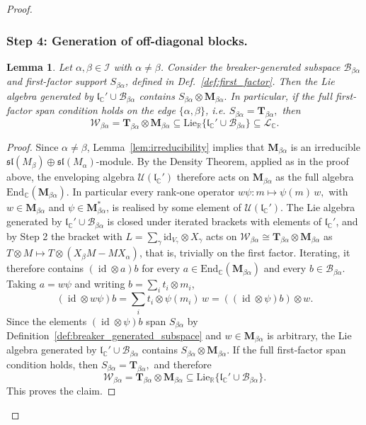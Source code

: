 \documentclass[11pt,letterpaper]{article}
\newcounter{alg}
\theoremstyle{plain}
\theoremstyle{plain}
\theoremstyle{plain}
\theoremstyle{plain}
\theoremstyle{plain}
\theoremstyle{plain}
\newcommand{\C}{\mathbb{C}}
\newcommand{\R}{\mathbb{R}}
\newcommand{\End}{\mathrm{End}}
\newcommand{\Lie}{\mathrm{Lie}}
\newcommand{\id}{\mathrm{id}}
\theoremstyle{plain}
\newtheorem{smlemma}[smtheorem]{Lemma}
\theoremstyle{definition}
\theoremstyle{plain}
\begin{document}
\begin{proof}
\subsubsection*{Step 4: Generation of off-diagonal blocks.}

\begin{smlemma}\label{prop:block_generation}
Let $\alpha,\beta\in\mathcal I$ with $\alpha\neq\beta$. Consider the
breaker-generated subspace $\mathcal B_{\beta\alpha}$ and first-factor support $S_{\beta\alpha}$, defined in Def.~\ref{def:first_factor}. Then the Lie algebra generated by
$
\mathfrak l_\C' \cup \mathcal B_{\beta\alpha}
$
contains
$
S_{\beta\alpha}\otimes \mathbf M_{\beta\alpha}.
$
In particular, if the full first-factor span condition holds on the edge $\{\alpha,\beta\}$, i.e.
$
S_{\beta\alpha}=\mathbf T_{\beta\alpha},
$
then
\[
\mathcal W_{\beta\alpha}
=
\mathbf T_{\beta\alpha}\otimes \mathbf M_{\beta\alpha}
\subseteq
\Lie_{\R}\{\mathfrak l_\C' \cup \mathcal B_{\beta\alpha}\}
\subseteq \mathcal L_\C.
\]
\end{smlemma}

\begin{proof}
Since $\alpha\neq\beta$, Lemma~\ref{lem:irreducibility} implies that $\mathbf M_{\beta\alpha}$ is an irreducible
$\mathfrak{sl}(M_\beta)\oplus \mathfrak{sl}(M_\alpha)$-module.
By the Density Theorem, applied as in the proof above, the enveloping algebra $\mathcal U(\mathfrak l_\C')$ therefore acts on $\mathbf M_{\beta\alpha}$ 
as the full algebra $\End_\C(\mathbf M_{\beta\alpha})$. In particular every rank-one operator
$
w\psi:m\mapsto\psi(m)\,w,
$
with $w\in\mathbf M_{\beta\alpha}$ and $\psi\in\mathbf M_{\beta\alpha}^*$, is realised by some element of $\mathcal U(\mathfrak l_\C')$.
The Lie algebra generated by $\mathfrak l_\C'\cup\mathcal B_{\beta\alpha}$ is closed under iterated brackets with elements of $\mathfrak l_\C'$, 
and by Step 2 the bracket with $L=\sum_\gamma\id_{V_\gamma}\otimes X_\gamma$ acts on $\mathcal W_{\beta\alpha}\cong\mathbf T_{\beta\alpha}\otimes\mathbf M_{\beta\alpha}$ as $T\otimes M\mapsto T\otimes(X_\beta M-MX_\alpha)$, 
that is, trivially on the first factor. Iterating, it therefore contains $(\operatorname{id}\otimes a)b$ for every $a\in\End_\C(\mathbf M_{\beta\alpha})$ 
and every $b\in\mathcal B_{\beta\alpha}$. Taking $a=w\psi$ and writing $b=\sum_i t_i\otimes m_i$,
\[
\left(\operatorname{id}\otimes w\psi\right)b
=\sum_i t_i\otimes\psi(m_i)\,w
=\left(\left(\operatorname{id}\otimes\psi\right)b\right)\otimes w .
\]
Since the elements $(\operatorname{id}\otimes\psi)b$ span $S_{\beta\alpha}$ by Definition~\ref{def:breaker_generated_subspace} and $w\in\mathbf M_{\beta\alpha}$ is arbitrary, the Lie algebra generated by
$
\mathfrak l_\C' \cup \mathcal B_{\beta\alpha}
$
contains
$
S_{\beta\alpha}\otimes \mathbf M_{\beta\alpha}.
$
If the full first-factor span condition holds, then
$
S_{\beta\alpha}=\mathbf T_{\beta\alpha},
$
and therefore
\[
\mathcal W_{\beta\alpha}
=
\mathbf T_{\beta\alpha}\otimes \mathbf M_{\beta\alpha}
\subseteq
\Lie_{\R}\{\mathfrak l_\C' \cup \mathcal B_{\beta\alpha}\}.
\]
This proves the claim.
\end{proof}


\end{proof}
\end{document}
